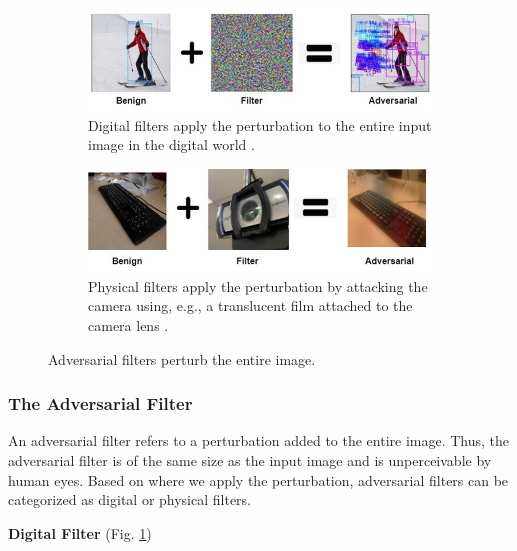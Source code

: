 \begin{figure}[b]
    \centering
    \begin{subfigure}[b]{\textwidth}
        \includegraphics[width=\linewidth]{figures/chapter_detection/detection/digital_filter.jpg}
        \caption{Digital filters apply the perturbation to the entire input image in the digital world \citep{wang2021daedalus}.}
        \label{fig:digital_filter}
    \end{subfigure}
    \begin{subfigure}[b]{\textwidth}
        \includegraphics[width=\linewidth]{figures/chapter_detection/detection/physical_filter.jpg}
        \caption{Physical filters apply the perturbation by attacking the camera using, e.g., a translucent film attached to the camera lens \citep{li2019adversarial}.}
        \label{fig:physical_filter}
    \end{subfigure}
    \caption{Adversarial filters perturb the entire image.}
    \label{fig:filter}
\end{figure}

\subsubsection{The Adversarial Filter}

An adversarial filter refers to a perturbation added to the entire image. Thus, the adversarial filter is of the same size as the input image and is unperceivable by human eyes. Based on where we apply the perturbation, adversarial filters can be categorized as digital or physical filters.

\textbf{Digital Filter} (Fig. \ref{fig:digital_filter})

